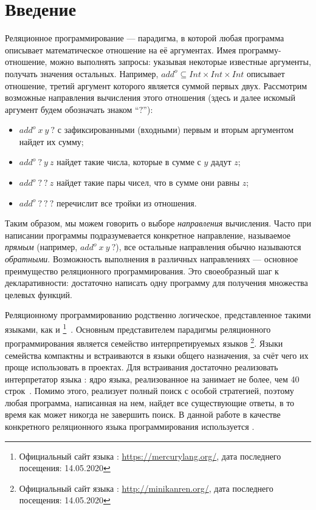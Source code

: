 \section*{Введение}

Реляционное программирование --- парадигма, в которой любая программа описывает математическое отношение на её аргументах. 
Имея программу-отношение, можно выполнять запросы: указывая некоторые известные аргументы, получать значения остальных.
Например, $add^o \subseteq Int \times Int \times Int$ описывает отношение, третий аргумент которого является суммой первых двух. 
Рассмотрим возможные направления вычисления этого отношения (здесь и далее искомый аргумент будем обозначать знаком ``$?$''):
\begin{itemize}
    \item $add^o  \ x \ y \ ?$ с зафиксированными (входными) первым и вторым аргументом найдет их сумму;
    \item $add^o \ ? \ y \ z$ найдет такие числа, которые в сумме с $y$ дадут $z$;
    \item $add^o \ ? \ ? \ z$ найдет такие пары чисел, что в сумме они равны $z$;
    \item $add^o \ ? \ ? \ ?$ перечислит все тройки из отношения.
\end{itemize}

Таким образом, мы можем говорить о выборе \textit{направления} вычисления. 
Часто при написании программы подразумевается конкретное направление, называемое \textit{прямым} (например, $add^o  \ x \ y \ ?$), все остальные направления обычно называются \textit{обратными}. 
Возможность выполнения в различных направлениях --- основное преимущество реляционного программирования. 
Это своеобразный шаг к декларативности: достаточно написать одну программу для получения множества целевых функций. 

Реляционному программированию родственно логическое, представленное такими языками, как \prolog{} и \mercury{}\footnote{Официальный сайт языка \mercury{}: \url{https://mercurylang.org/}, дата последнего посещения: 14.05.2020}~\cite{SOMOGYI199617}.
Основным представителем парадигмы реляционного программирования является семейство интерпретируемых языков \miniKanren{}\footnote{Официальный сайт языка \miniKanren{}: \url{http://minikanren.org/}, дата последнего посещения: 14.05.2020}.
Языки семейства \miniKanren{} компактны и встраиваются в языки общего назначения, за счёт чего их проще использовать в  проектах. 
Для встраивания достаточно реализовать интерпретатор языка \miniKanren{}: ядро языка, реализованное на \scheme{} занимает не более, чем 40 строк~\cite{hemann2013ukanren}.
Помимо этого, \miniKanren{} реализует полный поиск с особой стратегией, поэтому любая программа, написанная на нем, найдет все существующие ответы, в то время как \prolog{} может никогда не завершить поиск. 
В данной работе в качестве конкретного реляционного языка программирования используется \miniKanren{}.

